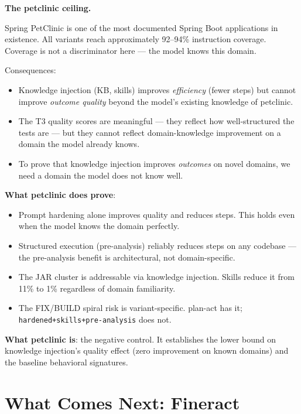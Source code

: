 \documentclass[11pt,a4paper]{article}
\begin{document}
\begin{warningbox}
\textbf{The petclinic ceiling.}

Spring PetClinic is one of the most documented Spring Boot applications in existence.
All variants reach approximately 92--94\% instruction coverage.
Coverage is not a discriminator here --- the model knows this domain.

Consequences:
\begin{itemize}
  \item Knowledge injection (KB, skills) improves \emph{efficiency} (fewer steps) but
        cannot improve \emph{outcome quality} beyond the model's existing knowledge of petclinic.
  \item The T3 quality scores are meaningful --- they reflect how well-structured
        the tests are --- but they cannot reflect domain-knowledge improvement
        on a domain the model already knows.
  \item To prove that knowledge injection improves \emph{outcomes} on novel domains,
        we need a domain the model does not know well.
\end{itemize}
\end{warningbox}

\textbf{What petclinic does prove}:

\begin{itemize}
  \item Prompt hardening alone improves quality and reduces steps.
    This holds even when the model knows the domain perfectly.
  \item Structured execution (pre-analysis) reliably reduces steps on any codebase ---
    the pre-analysis benefit is architectural, not domain-specific.
  \item The JAR cluster is addressable via knowledge injection.
    Skills reduce it from 11\% to 1\% regardless of domain familiarity.
  \item The FIX/BUILD spiral risk is variant-specific.
    plan-act has it; \texttt{hardened+skills+pre-analysis} does not.
\end{itemize}

\textbf{What petclinic is}: the negative control.
It establishes the lower bound on knowledge injection's quality effect
(zero improvement on known domains) and the baseline behavioral signatures.

\section{What Comes Next: Fineract}
\label{sec:fineract}
\end{document}
